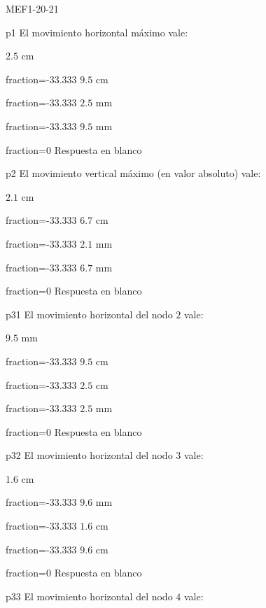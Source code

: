 \documentclass[a4paper]{article}
\begin{document}
\begin{quiz}{MEF1-20-21}

\begin{multi}{p1}
El movimiento horizontal m\'aximo vale:
	\item* $2.5$ cm
	\item[fraction=-33.333]  $9.5$ cm
	\item[fraction=-33.333]  $2.5$ mm
	\item[fraction=-33.333]  $9.5$ mm
	\item[fraction=0] Respuesta en blanco
\end{multi}

\begin{multi}{p2}
El movimiento vertical m\'aximo (en valor absoluto) vale:
	\item* $2.1$ cm
	\item[fraction=-33.333]  $6.7$ cm
	\item[fraction=-33.333]  $2.1$ mm
	\item[fraction=-33.333]  $6.7$ mm
	\item[fraction=0] Respuesta en blanco
\end{multi}
\begin{multi}{p31}
El movimiento horizontal del nodo $2$ vale:
	\item* $9.5$ mm
	\item[fraction=-33.333]  $9.5$ cm
	\item[fraction=-33.333]  $2.5$ cm
	\item[fraction=-33.333]  $2.5$ mm
	\item[fraction=0] Respuesta en blanco
\end{multi}
\begin{multi}{p32}
El movimiento horizontal del nodo $3$ vale:
	\item* $1.6$ cm
	\item[fraction=-33.333]  $9.6$ mm
	\item[fraction=-33.333]  $1.6$ cm
	\item[fraction=-33.333]  $9.6$ cm
	\item[fraction=0] Respuesta en blanco
\end{multi}
\begin{multi}{p33}
El movimiento horizontal del nodo $4$ vale:

\end{multi}
\end{quiz}
\end{document}
